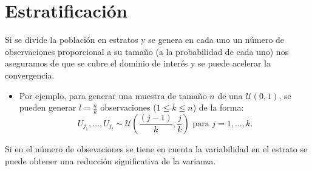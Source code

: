 \documentclass[
]{book}
\providecommand{\tightlist}{%
  \setlength{\itemsep}{0pt}\setlength{\parskip}{0pt}}
\theoremstyle{break}
\theoremstyle{nonumberplain}
\begin{document}
\hypertarget{estratificaciuxf3n}{%
\section{Estratificación}\label{estratificaciuxf3n}}

Si se divide la población en estratos y se genera en cada uno un
número de observaciones proporcional a su tamaño (a la probabilidad de cada uno) nos
aseguramos de que se cubre el dominio de interés y se puede acelerar
la convergencia.

\begin{itemize}
\tightlist
\item
  Por ejemplo, para generar una muestra de tamaño \(n\) de una
  \(\mathcal{U}\left( 0,1\right)\), se pueden generar \(l=\frac{n}{k}\)
  observaciones (\(1\leq k\leq n\)) de la forma:
  \[U_{j_{1}},\ldots,U_{j_{l}}\sim \mathcal{U}\left(  \frac{(j-1)}{k},\frac{j}{k}\right)  \text{ para }j=1,...,k.\]
\end{itemize}

Si en el número de obsevaciones se tiene en cuenta la
variabilidad en el estrato se puede obtener una reducción
significativa de la varianza.
\end{document}
